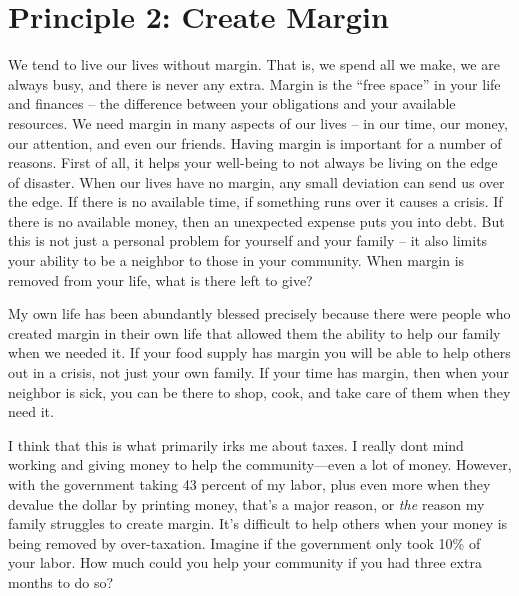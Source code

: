 \documentclass[letterpaper]{article}
\begin{document}
\section[Principle 2: Create Margin]{Principle 2: Create Margin}
{\color{black}
We tend to live our lives without margin. That is, we spend all we make,
we are always busy, and there is never any extra. Margin is the “free
space” in your life and finances – the difference between your
obligations and your available resources.  We need margin in many
aspects of our lives – in our time, our money, our attention, and even
our friends.  Having margin is important for a number of reasons. 
First of all, it helps your well-being to not always be living on the
edge of disaster.  When our lives have no margin, any small deviation
can send us over the edge.  If there is no available time, if something
runs over it causes a crisis.  If there is no available money, then an
unexpected expense puts you into debt.  But this is not just a personal
problem for yourself and your family – it also limits your ability to
be a neighbor to those in your community. 
When\textcolor[rgb]{0.32941177,0.5529412,0.83137256}{ margin} is
removed from your life, what is there left to give?  }

{\color{black}
My own life has been abundantly blessed precisely because there were
people who created margin in their own life that allowed them the
ability to help our family when we needed it. If your food supply has
margin you will be able to help others out
\textcolor[rgb]{0.32941177,0.5529412,0.83137256}{in a crisis}, not just
your own family.\textcolor[rgb]{0.32941177,0.5529412,0.83137256}{  If
your time has margin, then when your neighbor is sick, you can be there
to shop, cook, and take care of them when they need it.}}

{\color{black}
I think that this is what primarily irks me about taxes. I really
don{\textquotesingle}t mind working and giving money to help the
community—even a lot of money. However, with the government taking 43
percent of \textcolor[rgb]{0.32941177,0.5529412,0.83137256}{my} labor,
plus even more when they devalue the dollar by printing money, 
\textcolor[rgb]{0.32941177,0.5529412,0.83137256}{that’s a major reason,
or }\textit{\textcolor[rgb]{0.32941177,0.5529412,0.83137256}{the
}}\textcolor[rgb]{0.32941177,0.5529412,0.83137256}{reason my family
struggles to create margin. It’s difficult to help others when your
money is being removed by over-taxation.  Imagine if the government
only took 10\% of your labor.  How much could you help your community
if you had three extra months to do so?}}
\end{document}
